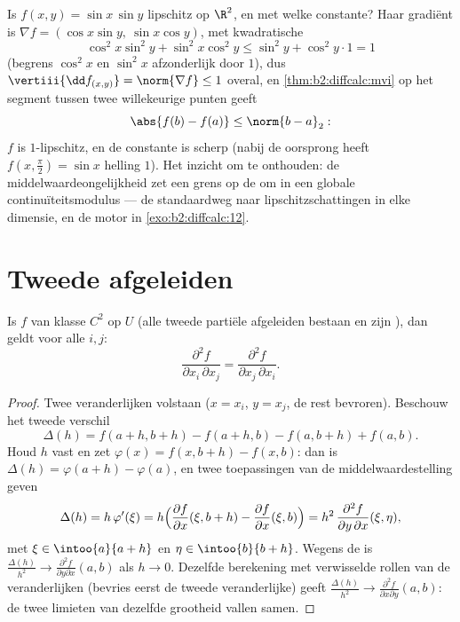 \begin{example}\label{ex:b2:diffcalc:lipschitz}
Is $f(x, y) = \sin x\,\sin y$ lipschitz op $\R^2$, en met welke
constante? Haar gradiënt is $\nabla f = (\cos x\sin y,\ \sin x\cos
y)$, met kwadratische 
\[
\cos^2x\sin^2y + \sin^2x\cos^2y
\leq \sin^2 y + \cos^2y\cdot 1 = 1
\]
(begrens $\cos^2x$ en $\sin^2x$ afzonderlijk door $1$), dus
$\vertiii{\dd f_{(x,y)}} = \norm{\nabla f} \leq 1$ overal, en
\cref{thm:b2:diffcalc:mvi} op het segment tussen twee willekeurige
punten geeft
\[
\abs{f(b) - f(a)} \leq \norm{b - a}_2 :
\]
$f$ is $1$-lipschitz, en de constante is scherp (nabij de
oorsprong heeft $f(x, \tfrac\pi2) = \sin x$ helling $1$). Het
inzicht om te onthouden: de middelwaardeongelijkheid zet een
 grens op de  om in een globale
continuïteitsmodulus --- de standaardweg naar lipschitzschattingen
in elke dimensie, en de motor in \cref{exo:b2:diffcalc:12}.
\end{example}

\section{Tweede afgeleiden}

\begin{theorem}[Schwarz]\label{thm:b2:diffcalc:schwarz}
Is $f$ van klasse $C^2$ op $U$ (alle tweede partiële afgeleiden
bestaan en zijn ), dan geldt voor alle $i,
j$:
\[
\frac{\partial^2 f}{\partial x_i\,\partial x_j}
= \frac{\partial^2 f}{\partial x_j\,\partial x_i} .
\]
\end{theorem}

\begin{proof}
Twee veranderlijken volstaan ($x = x_i$, $y = x_j$, de rest
bevroren). Beschouw het tweede verschil
\[
\Delta(h) = f(a + h, b + h) - f(a + h, b) - f(a, b + h) + f(a,b) .
\]
Houd $h$ vast en zet $\varphi(x) = f(x, b+h) - f(x, b)$: dan is
$\Delta(h) = \varphi(a + h) - \varphi(a)$, en twee toepassingen van
de middelwaardestelling geven
\[
\Delta(h) = h\,\varphi'(\xi)
= h\Bigl(\frac{\partial f}{\partial x}(\xi, b+h) -
\frac{\partial f}{\partial x}(\xi, b)\Bigr)
= h^2\,\frac{\partial^2 f}{\partial y\,\partial x}(\xi, \eta),
\]
met $\xi \in \intoo{a}{a+h}$ en $\eta \in \intoo{b}{b+h}$. Wegens
de  is $\frac{\Delta(h)}{h^2} \to \frac{\partial^2
f}{\partial y\partial x}(a, b)$ als $h \to 0$. Dezelfde berekening
met verwisselde rollen van de veranderlijken (bevries eerst de
tweede veranderlijke) geeft $\frac{\Delta(h)}{h^2} \to
\frac{\partial^2 f}{\partial x \partial y}(a,b)$: de twee limieten
van dezelfde grootheid vallen samen.
\end{proof}

